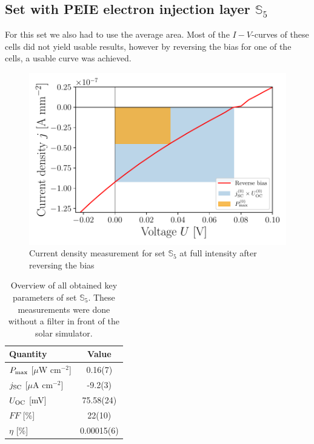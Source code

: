 \subsection{Set with PEIE electron injection layer $\mathbb{S}_5$}
For this set we also had to use the average area. Most of the $I-V$-curves of these cells did not yield usable results, however by reversing the bias for one of the cells, a usable curve was achieved.
\begin{figure}[ht]
\centering
\includegraphics[width=\columnwidth]{../../../IV-Curve-Analysis/OSC5Graph.pdf}
\caption{Current density measurement for set $\mathbb{S}_5$ at full intensity after reversing the bias}
\end{figure}
\begin{table}[ht]
\centering
\caption{Overview of all obtained key parameters of set $\mathbb{S}_5$. These measurements were done without a filter in front of the solar simulator.}
\label{tab:OSC5table}
\begin{tabular}{@{}lc@{}}
\toprule
 Quantity&Value\\\midrule
$P_{\text{max}}$ [$\mu$W cm$^{-2}$] & 0.16(7) \\
$j_{\text{SC}}$ [$\mu$A $\mathrm{cm}^{-2}$]             & -9.2(3)                     \\
$U_{\text{OC}}$ [mV]                                    & 75.58(24)                   \\
$FF$ [\%]                                      & 22(10)                      \\
$\eta$ [\%]                                    & 0.00015(6)                  \\ \bottomrule
\end{tabular}
\end{table}
